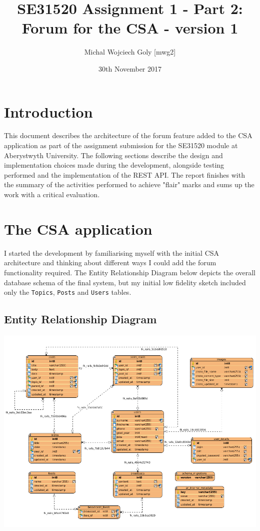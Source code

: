 \documentclass[a4paper, 11pt, titlepage]{article}
\title{SE31520 Assignment 1 - Part 2: Forum for the CSA - version 1}
\author{Michal Wojciech Goly [mwg2]}
\date{30th November 2017}
\begin{document}
\maketitle
\tableofcontents
\newpage

\section{Introduction}
This document describes the architecture of the forum feature added to the CSA application
as part of the assignment submission for the SE31520 module at Aberystwyth University. The
following sections describe the design and implementation choices made during the development,
alongside testing performed and the implementation of the REST API. The report finishes with
the summary of the activities performed to achieve "flair" marks and sums up the work with
a critical evaluation.

\section{The CSA application}
I started the development by familiarising myself with the initial CSA architecture and
thinking about different ways I could add the forum functionality required. The Entity Relationship
Diagram below depicts the overall database schema of the final system, but my initial low fidelity
sketch included only the \texttt{Topics}, \texttt{Posts} and \texttt{Users} tables.

\subsection{Entity Relationship Diagram}
\begin{center}
  \includegraphics[scale=0.5]{schema}
\end{center}
\end{document}

